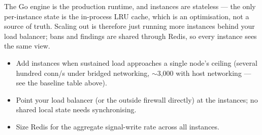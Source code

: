 The Go engine is the production runtime, and instances are stateless — the only
per-instance state is the in-process LRU cache, which is an optimisation, not a
source of truth. Scaling out is therefore just running more instances behind your
load balancer; bans and findings are shared through Redis, so every instance sees
the same view.

\begin{itemize}
  \item Add instances when sustained load approaches a single node's ceiling
    (several hundred conn/s under bridged networking, $\sim$3{,}000 with host
    networking — see the baseline table above).
  \item Point your load balancer (or the outside firewall directly) at the
    instances; no shared local state needs synchronising.
  \item Size Redis for the aggregate signal-write rate across all instances.
\end{itemize}
